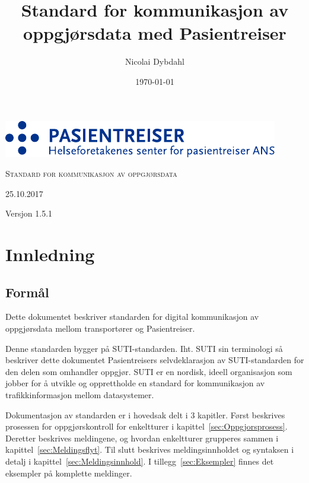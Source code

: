 \documentclass[a4paper,titlepage,norsk,11pt]{article}
\begin{document}

\title{Standard for kommunikasjon av oppgjørsdata med Pasientreiser}

\author{Nicolai Dybdahl}
\renewcommand{\dateseparator}{.}
\date{\ddmmyyyydate \today}

\begin{titlepage}
\vspace*{3cm}
{\centering

  \includegraphics[scale=1.2]{pasientreiser.pdf} \\
  \vspace{5.5cm}
  {\scshape\huge Standard for kommunikasjon av oppgjørsdata\par}
  \vspace{2cm}
  {\large 25.10.2017\par}
  \vspace{1.5cm}
  {\large Versjon 1.5.1\par}

}

\end{titlepage}

\newpage

\setcounter{tocdepth}{2}

\newpage
\tableofcontents

\newpage
{}

\section{Innledning}

\subsection{Formål}
Dette dokumentet beskriver standarden for digital kommunikasjon av oppgjørsdata mellom transportører og Pasientreiser.

Denne standarden bygger på SUTI-standarden. Iht. SUTI sin terminologi så beskriver dette dokumentet Pasientreisers selvdeklarasjon av SUTI-standarden for den delen som omhandler oppgjør. SUTI  er en nordisk, ideell organisasjon som jobber for å utvikle og opprettholde en standard for kommunikasjon av trafikkinformasjon mellom datasystemer.

Dokumentasjon av standarden er i hovedsak delt i 3 kapitler. Først beskrives prosessen for oppgjørskontroll for enkeltturer i kapittel~\ref{sec:Oppgjorsprosess}. Deretter beskrives meldingene, og hvordan enkeltturer grupperes sammen i kapittel~\ref{sec:Meldingsflyt}. Til slutt beskrives meldingsinnholdet og syntaksen i detalj i kapittel~\ref{sec:Meldingsinnhold}. I tillegg~\ref{sec:Eksempler} finnes det eksempler på komplette meldinger.
\end{document}
